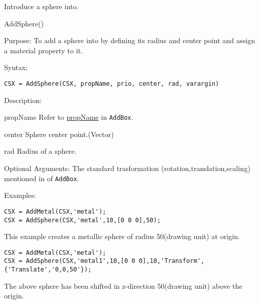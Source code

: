 Introduce a sphere into\hyperref[CSX]{}. 

\begin{FontNameFunct}{AddSphere()}
\end{FontNameFunct}


\begin{FontDescr}{Purpose:}
To add a sphere into\label{CSX} by defining its radius and center point and assign a material property to it.  
\end{FontDescr}

\begin{FontDescr}{Syntax:}
\begin{lstlisting} 
CSX = AddSphere(CSX, propName, prio, center, rad, varargin)
\end{lstlisting}
\end{FontDescr}

\begin{FontDescr}{Description:}

\begin{FontPara}{propName}
Refer to \hyperref[prim_Name]{propName} in \texttt{AddBox}. 
\end{FontPara}

\begin{FontPara}{center}
Sphere center point.(Vector) 
\end{FontPara}

\begin{FontPara}{rad}
Radius of a sphere.
\end{FontPara}
\end{FontDescr}

\begin{FontDescr}{Optional Arguments:}
The standard trasformation (rotation,translation,scaling) mentioned in  \hyperref[prim_transform]{} of \texttt{AddBox}.   
\end{FontDescr}

\begin{FontDescr}{Examples:}

\begin{lstlisting} 
CSX = AddMetal(CSX,'metal'); 
CSX = AddSphere(CSX,'metal',10,[0 0 0],50);
\end{lstlisting}
This example creates a metallic sphere of radius 50(drawing unit) at origin. 

\begin{lstlisting} 
CSX = AddMetal(CSX,'metal'); 
CSX = AddSphere(CSX,'metal1',10,[0 0 0],10,'Transform',{'Translate','0,0,50'});  
\end{lstlisting}
The above sphere has been shifted in z-direction 50(drawing unit) above the origin. 

\end{FontDescr}



